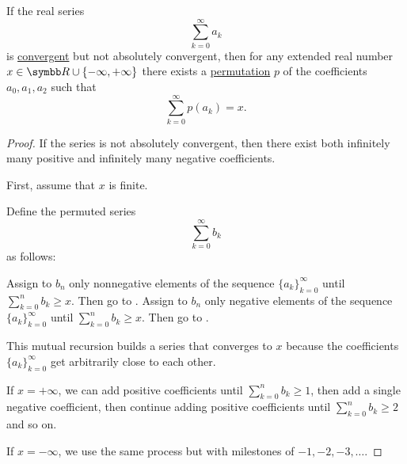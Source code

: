 \begin{theorem}\label{thm:riemanns_series_permutation_theorem}
  If the real series
  \begin{equation*}
    \sum_{k=0}^\infty a_k
  \end{equation*}
  is \hyperref[def:convergent_series]{convergent} but not absolutely convergent, then for any extended real number \( x \in \BR \cup \{ -\infty, +\infty \} \) there exists a \hyperref[def:symmetric_group]{permutation} \( p \) of the coefficients \( a_0, a_1, a_2 \)
  such that
  \begin{equation*}
    \sum_{k=0}^\infty p(a_k) = x.
  \end{equation*}
\end{theorem}
\begin{proof}
  If the series is not absolutely convergent, then there exist both infinitely many positive and infinitely many negative coefficients.

  First, assume that \( x \) is finite.

  Define the permuted series
  \begin{equation*}
    \sum_{k=0}^\infty b_k
  \end{equation*}
  as follows:
  \begin{AlgEnum}
     Assign to \( b_n \) only nonnegative elements of the sequence \( \{ a_k \}_{k=0}^\infty \) until \( \sum_{k=0}^n b_k \geq x \). Then go to .
     Assign to \( b_n \) only negative elements of the sequence \( \{ a_k \}_{k=0}^\infty \) until \( \sum_{k=0}^n b_k \geq x \). Then go to .
  \end{AlgEnum}

  This mutual recursion builds a series that converges to \( x \) because the coefficients \( \{ a_k \}_{k=0}^\infty \) get arbitrarily close to each other.

  If \( x = +\infty \), we can add positive coefficients until \( \sum_{k=0}^n b_k \geq 1 \), then add a single negative coefficient, then continue adding positive coefficients until \( \sum_{k=0}^n b_k \geq 2 \) and so on.

  If \( x = -\infty \), we use the same process but with milestones of \( -1, -2, -3, \ldots \).
\end{proof}

